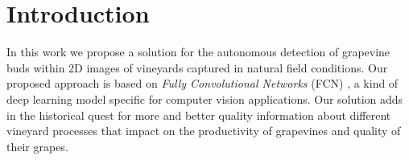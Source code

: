 \documentclass[a4paper,authoryear,review]{elsarticle}
\begin{document}
	\linenumbers
	
	
	\section{Introduction} 
	
	In this work we propose a solution for the autonomous detection of grapevine buds within 2D images of vineyards captured in natural field conditions. Our proposed approach is based on \emph{Fully Convolutional Networks} (FCN) \citep{long2015fully, shelhamer2017fully}, a kind of deep learning model specific for computer vision applications. Our solution adds in the historical quest for more and better quality information about different vineyard processes that impact on the productivity of grapevines and quality of their grapes. 
	
\end{document}
